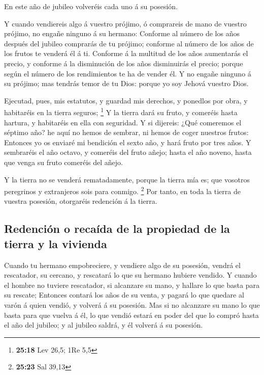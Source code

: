  En este año de jubileo volveréis cada uno á su posesión.

 Y cuando vendiereis algo á vuestro prójimo, ó comprareis
de mano de vuestro prójimo, no engañe ninguno á su hermano:
 Conforme al número de los años después del jubileo
comprarás de tu prójimo; conforme al número de los años de los frutos te
venderá él á ti.  Conforme á la multitud de los años
aumentarás el precio, y conforme á la disminución de los años
disminuirás el precio; porque según el número de los rendimientos te ha
de vender él.  Y no engañe ninguno á su prójimo; mas
tendrás temor de tu Dios: porque yo soy Jehová vuestro Dios.

 Ejecutad, pues, mis estatutos, y guardad mis derechos, y
ponedlos por obra, y habitaréis en la tierra seguros; \footnote{\textbf{25:18}
  Lev 26,5; 1Re 5,5}  Y la tierra dará su fruto, y comeréis
hasta hartura, y habitaréis en ella con seguridad.  Y si
dijereis: ¿Qué comeremos el séptimo año? he aquí no hemos de sembrar, ni
hemos de coger nuestros frutos:  Entonces yo os enviaré mi
bendición el sexto año, y hará fruto por tres años.  Y
sembraréis el año octavo, y comeréis del fruto añejo; hasta el año
noveno, hasta que venga su fruto comeréis del añejo.

 Y la tierra no se venderá rematadamente, porque la tierra
mía es; que vosotros peregrinos y extranjeros sois para conmigo.
\footnote{\textbf{25:23} Sal 39,13}  Por tanto, en toda la
tierra de vuestra posesión, otorgaréis redención á la tierra.

\hypertarget{redenciuxf3n-o-recauxedda-de-la-propiedad-de-la-tierra-y-la-vivienda}{%
\subsection{Redención o recaída de la propiedad de la tierra y la
vivienda}\label{redenciuxf3n-o-recauxedda-de-la-propiedad-de-la-tierra-y-la-vivienda}}

 Cuando tu hermano empobreciere, y vendiere algo de su
posesión, vendrá el rescatador, su cercano, y rescatará lo que su
hermano hubiere vendido.  Y cuando el hombre no tuviere
rescatador, si alcanzare su mano, y hallare lo que basta para su
rescate;  Entonces contará los años de su venta, y pagará
lo que quedare al varón á quien vendió, y volverá á su posesión.
 Mas si no alcanzare su mano lo que basta para que vuelva á
él, lo que vendió estará en poder del que lo compró hasta el año del
jubileo; y al jubileo saldrá, y él volverá á su posesión.

